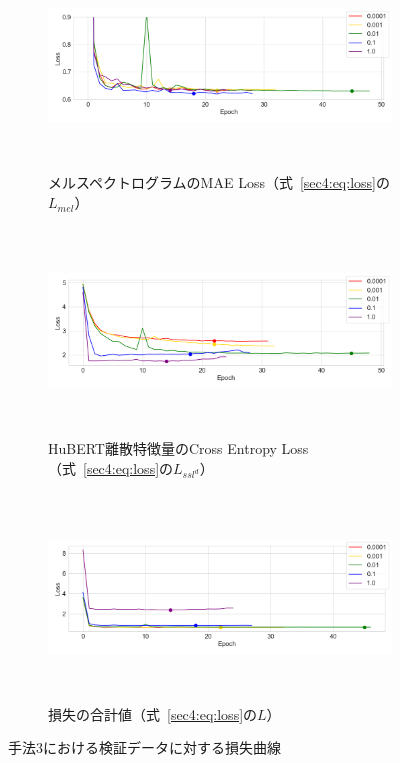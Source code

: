 \documentclass[12pt]{jarticle}
\numberwithin{equation}{section}    %
\numberwithin{figure}{section}      %
\numberwithin{table}{section}      %
\begin{document}
\begin{figure}[bt]
    \centering
    \begin{subfigure}{\linewidth}
        \centering
        \includegraphics[height=55mm]{./figure/sec4/loss_curve/3/mel_loss.png}
        \caption{メルスペクトログラムのMAE Loss（式~\eqref{sec4:eq:loss}の$L_{mel}$）}
        \label{sec4:fig:method_3_val_mel_loss}
    \end{subfigure}
    \begin{subfigure}{\linewidth}
        \centering
        \includegraphics[height=55mm]{./figure/sec4/loss_curve/3/ssl_feature_cluster_loss.png}
        \caption{HuBERT離散特徴量のCross Entropy Loss（式~\eqref{sec4:eq:loss}の$L_{ssl^{d}}$）}
        \label{sec4:fig:method_3_val_ssl_feature_cluster_loss}
    \end{subfigure}
    \begin{subfigure}{\linewidth}
        \centering
        \includegraphics[height=55mm]{./figure/sec4/loss_curve/3/total_loss.png}
        \caption{損失の合計値（式~\eqref{sec4:eq:loss}の$L$）}
        \label{sec4:fig:method_3_val_total_loss}
    \end{subfigure}
    \caption{手法3における検証データに対する損失曲線}
    \label{sec4:fig:method_3_val_losses}
\end{figure}
\end{document}
